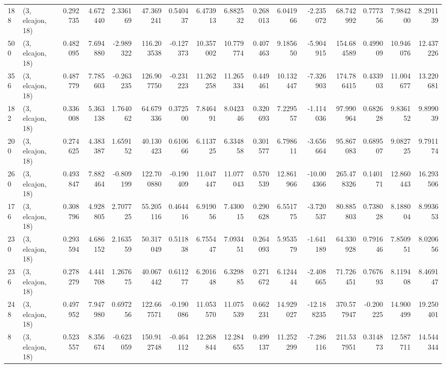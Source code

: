 \begin{tabular}{llrrrrrrrrrrrrrr}
188 &  (3, elcajon, 18) &   0.292735 &   4.672440 &   2.336169 &    47.369241 &   0.540437 &   6.473913 &   6.882532 &  0.268013 &   6.041966 &  -2.235072 &    68.742992 &  0.777356 &   7.984200 &   8.291139 \\
500 &  (3, elcajon, 18) &   0.482095 &   7.694880 &  -2.989322 &   116.203538 &  -0.127373 &  10.357002 &  10.779774 &  0.407463 &   9.185650 &  -5.904915 &   154.684589 &  0.499009 &  10.946076 &  12.437226 \\
356 &  (3, elcajon, 18) &   0.487779 &   7.785603 &  -0.263235 &   126.907750 &  -0.231223 &  11.262258 &  11.265334 &  0.449461 &  10.132447 &  -7.326903 &   174.786415 &  0.433903 &  11.004677 &  13.220681 \\
182 &  (3, elcajon, 18) &   0.336008 &   5.363138 &   1.764062 &    64.679336 &   0.372500 &   7.846491 &   8.042346 &  0.320693 &   7.229557 &  -1.114036 &    97.990964 &  0.682628 &   9.836152 &   9.899039 \\
200 &  (3, elcajon, 18) &   0.274625 &   4.383387 &   1.659152 &    40.130423 &   0.610666 &   6.113725 &   6.334858 &  0.301577 &   6.798611 &  -3.656664 &    95.867083 &  0.689507 &   9.082725 &   9.791174 \\
260 &  (3, elcajon, 18) &   0.493847 &   7.882464 &  -0.809199 &   122.700880 &  -0.190409 &  11.047447 &  11.077043 &  0.570539 &  12.861966 & -10.004366 &   265.478326 &  0.140171 &  12.860443 &  16.293506 \\
176 &  (3, elcajon, 18) &   0.308796 &   4.928805 &   2.707725 &    55.205116 &   0.464416 &   6.919056 &   7.430015 &  0.290628 &   6.551775 &  -3.720537 &    80.885803 &  0.738028 &   8.188004 &   8.993653 \\
230 &  (3, elcajon, 18) &   0.293594 &   4.686152 &   2.163559 &    50.317049 &   0.511838 &   6.755447 &   7.093451 &  0.264093 &   5.953579 &  -1.641189 &    64.330928 &  0.791646 &   7.850951 &   8.020656 \\
236 &  (3, elcajon, 18) &   0.278279 &   4.441708 &   1.267675 &    40.067442 &   0.611277 &   6.201648 &   6.329885 &  0.271672 &   6.124444 &  -2.408665 &    71.726451 &  0.767693 &   8.119408 &   8.469147 \\
248 &  (3, elcajon, 18) &   0.497952 &   7.947980 &   0.697256 &   122.667571 &  -0.190086 &  11.053570 &  11.075539 &  0.662231 &  14.929027 & -12.188235 &   370.577947 & -0.200225 &  14.900499 &  19.250401 \\
8   &  (3, elcajon, 18) &   0.523557 &   8.356674 &  -0.623059 &   150.912748 &  -0.464112 &  12.268844 &  12.284655 &  0.499137 &  11.252299 &  -7.286116 &   211.537951 &  0.314873 &  12.587711 &  14.544344 \\

\end{tabular}
